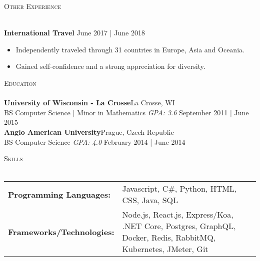 \documentclass[a4paper]{article}
\newcommand{\lineunder} {
    \vspace*{-8pt} \\
    \hspace*{-18pt} \hrulefill \\
}
\newcommand{\header} [1] {
    {\hspace*{-18pt}\vspace*{6pt} \textsc{#1}}
    \vspace*{-6pt} \lineunder
}
\begin{document}
\header{Other Experience}
\vspace{1mm}

\textbf{International Travel} \hfill June 2017 | June 2018\\
\vspace{-1mm}
\begin{itemize} \itemsep 1pt
	\item Independently traveled through 31 countries in Europe, Asia and Oceania.
	\item Gained self-confidence and a strong appreciation for diversity.
\end{itemize}

\header{Education}
\textbf{University of Wisconsin - La Crosse}\hfill La Crosse, WI\\
BS Computer Science | Minor in Mathematics \textit{GPA: 3.6} \hfill September 2011 | June 2015\\
\vspace{2mm}
\textbf{Anglo American University}\hfill Prague, Czech Republic\\
BS Computer Science \textit{GPA: 4.0} \hfill February 2014 | June 2014\\
\vspace{2mm}

\header{Skills}
\begin{tabularx}{\textwidth}{@{} p{150pt} P}
\textbf{Programming Languages:} & Javascript, C\#, Python, HTML, CSS, Java, SQL \\
\textbf{Frameworks/Technologies:} & Node.js, React.js, Express/Koa, .NET Core, Postgres, GraphQL, Docker, Redis, RabbitMQ, Kubernetes, JMeter, Git \\
\end{tabularx}
\vspace{2mm}
\end{document}
